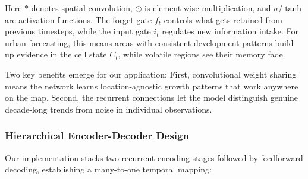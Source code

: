 \documentclass[conference]{IEEEtran}
\begin{document}
Here $*$ denotes spatial convolution, $\odot$ is element-wise multiplication, and $\sigma$/$\tanh$ are activation functions. The forget gate $f_t$ controls what gets retained from previous timesteps, while the input gate $i_t$ regulates new information intake. For urban forecasting, this means areas with consistent development patterns build up evidence in the cell state $C_t$, while volatile regions see their memory fade.

Two key benefits emerge for our application: First, convolutional weight sharing means the network learns location-agnostic growth patterns that work anywhere on the map. Second, the recurrent connections let the model distinguish genuine decade-long trends from noise in individual observations.

\subsubsection{Hierarchical Encoder-Decoder Design}
Our implementation stacks two recurrent encoding stages followed by feedforward decoding, establishing a many-to-one temporal mapping:
\end{document}
